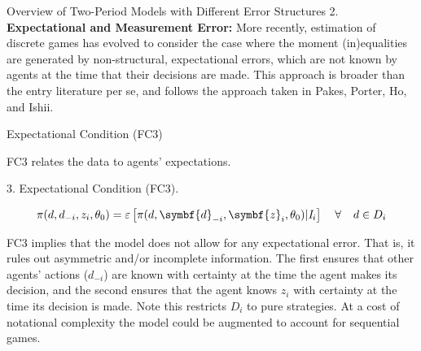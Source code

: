 \begin{frame}{Overview of Two-Period Models with Different Error Structures}
\vspace{2mm}
2.  {\bf Expectational and Measurement Error:} More recently, estimation of discrete games has evolved to consider the case where the moment (in)equalities are generated by non-structural, expectational errors, which are not known by agents at the time that their decisions are made. This approach is broader than the entry literature per se, and follows the approach taken in Pakes, Porter, Ho, and Ishii. 
\end{frame}

\begin{frame}{Expectational Condition (FC3)}

FC3 relates the data to agents' expectations.

\vspace{0.2in}

3. Expectational Condition (FC3).

\begin{equation*}
\pi (d,d_{-i},z_{i},\theta _{0})=\varepsilon \left[ \pi (d,\symbf{d}%
_{-i},\symbf{z}_{i},\theta _{0})|\mathit{I}_{i}\right] \text{ \hspace{0.1in}} \forall  \text{ \hspace{0.1in}} d\in D_{i}
\end{equation*}

FC3 implies that the model does not allow for any expectational error. That
is, it rules out asymmetric and/or incomplete information. The first ensures
that other agents' actions ($d_{-i}$) are known with certainty at the time
the agent makes its decision, and the second ensures that the agent knows $%
z_{i}$ with certainty at the time its decision is made.  Note this restricts $D_i$ to pure strategies.  At a cost of
notational complexity the model could be augmented to account for sequential
games.

\end{frame}

